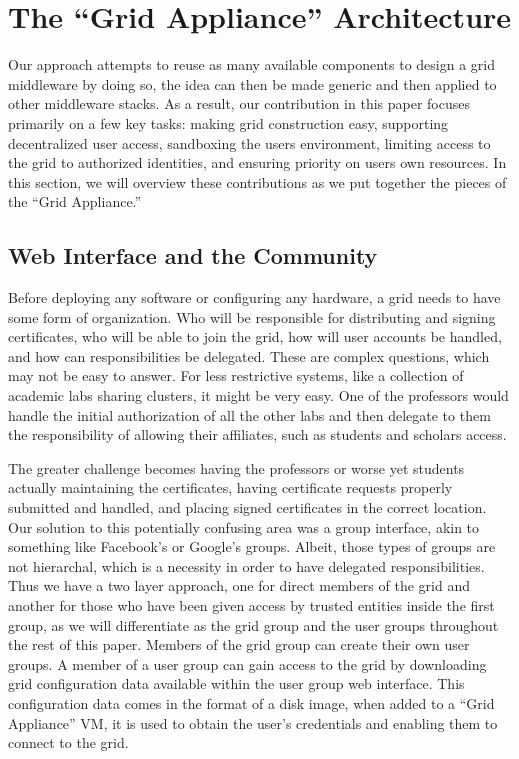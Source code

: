 \documentclass[conference]{IEEEtran}
\begin{document}
\section{The ``Grid Appliance'' Architecture}
\label{architecture}

Our approach attempts to reuse as many available components to design a grid
middleware by doing so, the idea can then be made generic and then applied to
other middleware stacks.  As a result, our contribution in this paper focuses
primarily on a few key tasks:  making grid construction easy, supporting
decentralized user access, sandboxing the users environment, limiting access to
the grid to authorized identities, and ensuring priority on users own
resources.  In this section, we will overview these contributions as we put
together the pieces of the ``Grid Appliance.''

\subsection{Web Interface and the Community}

Before deploying any software or configuring any hardware, a grid needs to have
some form of organization.  Who will be responsible for distributing and
signing certificates, who will be able to join the grid, how will user accounts
be handled, and how can responsibilities be delegated.  These are complex
questions, which may not be easy to answer.  For less
restrictive systems, like a collection of academic labs sharing clusters, it
might be very easy.  One of the professors would handle the initial
authorization of all the other labs and then delegate to them the
responsibility of allowing their affiliates, such as students and scholars
access.

The greater challenge becomes having the professors or worse yet students
actually maintaining the certificates, having certificate requests properly
submitted and handled, and placing signed certificates in the correct location.
Our solution to this potentially confusing area was a group interface, akin to
something like Facebook's or Google's groups.  Albeit, those types of groups
are not hierarchal, which is a necessity in order to have delegated
responsibilities.  Thus we have a two layer approach, one for direct members of
the grid and another for those who have been given access by trusted entities
inside the first group, as we will differentiate as the grid group and the user
groups throughout the rest of this paper.  Members of the grid group can create
their own user groups.  A member of a user group can gain access to the grid by
downloading grid configuration data available within the user group web
interface.  This configuration data comes in the format of a disk image, when
added to a ``Grid Appliance'' VM, it is used to obtain the user's credentials
and enabling them to connect to the grid.
\end{document}
